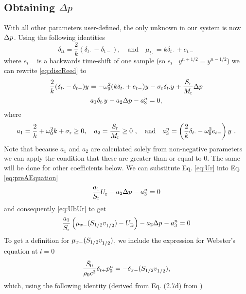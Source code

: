\subsection{Obtaining $\Delta p$}\label{sec:obtainingDeltaP}
With all other parameters user-defined, the only unknown in our system is now $\Delta p^{}$. Using the following identities
\begin{equation}
    \delta_{tt} = \frac{2}{k}(\delta_{t\cdot} - \delta_{t-}), \quad \text{and} \quad \mu_{t\cdot} = k\delta_{t\cdot} + e_{t-}
\end{equation}
where $e_{t-}$ is a backwards time-shift of one sample (so $e_{t-}y^{n+1/2} = y^{n-1/2}$) we can rewrite \eqref{eq:discReed} to
\begin{gather}
    \frac{2}{k} (\delta_{t\cdot} - \delta_{t-})y^{} = -\omega_0^2(k\delta_{t\cdot} + e_{t-})y^{} - \sigma_\text{r}\delta_{t\cdot} y^{} + \frac{S_\text{r}}{M_\text{r}}\Delta p^{}\nonumber\\
    a_1\delta_{t\cdot}y^{} - a_2\Delta p^{} - a_3^n = 0,\label{eq:preAEquation}
\end{gather}
where
\begin{equation}\label{eq:aCoeffs}
    a_1 = \frac{2}{k} + \omega_0^2k + \sigma_\text{r} \geq 0, \quad a_2 = \frac{S_\text{r}}{M_\text{r}} \geq 0\ , \quad \text{and} \quad a_3^n = \left(\frac{2}{k} \delta_{t\cdot} - \omega_0^2e_{t-}\right)y^{\nph}\ .
\end{equation}
Note that because $a_1$ and $a_2$ are calculated solely from non-negative parameters we can apply the condition that these are greater than or equal to 0. The same will be done for other coefficients below.
We can substitute Eq. \eqref{eq:Ur} into Eq. \eqref{eq:preAEquation}
\begin{equation}
    \frac{a_1}{S_\text{r}}U_\text{r}^{} - a_2 \Delta p^{} - a_3^n = 0
\end{equation}
and consequently \eqref{eq:UbUr} to get
\begin{equation}\label{eq:aEquation}
    \frac{a_1}{S_\text{r}}\left(\mu_{x-}(S_{1/2}v_{1/2}^{}) - U_\text{B}^{}\right) - a_2 \Delta p^{} - a_3^n = 0
\end{equation}
%
To get a definition for $\mu_{x-}(S_{1/2}v_{1/2}^{})$, we include the expression for Webster's equation at $l=0$
\begin{equation}
    \frac{\bar S_0}{\rho_0 c^2}\delta_{t+}p_0^n = -\delta_{x-}(S_{1/2}v_{1/2}^{}),
\end{equation}
which, using the following identity (derived from Eq. (2.7d) from \cite{theBible})
